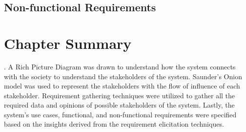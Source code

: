 \subsection{Non-functional Requirements}

\section{Chapter Summary}
. A Rich Picture Diagram was drawn to understand how the system connects with the society to understand the stakeholders of the system. Saunder's Onion model was used to represent the stakeholders with the flow of influence of each stakeholder. Requirement gathering techniques were utilized to gather all the required data and opinions of possible stakeholders of the system. Lastly, the system's use cases, functional, and non-functional requirements were specified based on the insights derived from the requirement elicitation techniques.